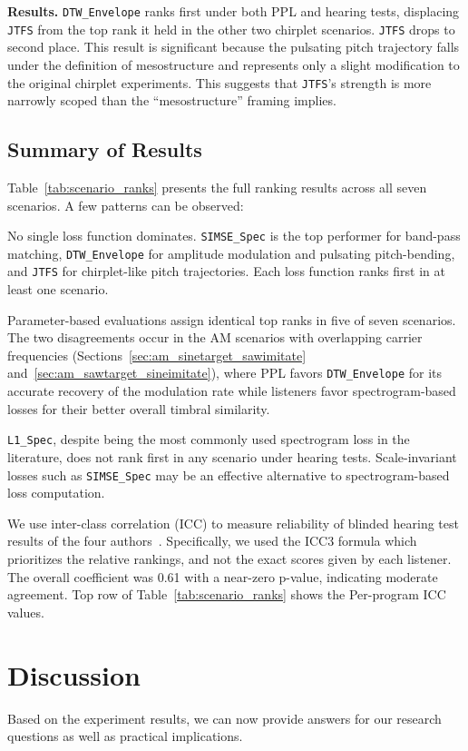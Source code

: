 \documentclass[10pt]{article} %
\newcommand{\SIMSESpec}{\texttt{SIMSE\_\allowbreak Spec}\xspace}
\newcommand{\LoneSpec}{\texttt{L1\_\allowbreak Spec}\xspace}
\newcommand{\JTFS}{\texttt{JTFS}\xspace}
\newcommand{\DTWEnv}{\texttt{DTW\_\allowbreak Envelope}\xspace}
\begin{document}
\noindent \textbf{Results.} \DTWEnv ranks first under both PPL and hearing tests, displacing \JTFS from the top rank it held in the other two chirplet scenarios. \JTFS drops to second place. This result is significant because the pulsating pitch trajectory falls under the definition of mesostructure and represents only a slight modification to the original chirplet experiments. This suggests that \JTFS's strength is more narrowly scoped than the ``mesostructure'' framing implies.


\subsection{Summary of Results}

Table~\ref{tab:scenario_ranks} presents the full ranking results across all seven scenarios. A few patterns can be observed:

No single loss function dominates. \SIMSESpec{} is the top performer for band-pass matching, \DTWEnv{} for amplitude modulation and pulsating pitch-bending, and \JTFS{} for chirplet-like pitch trajectories. Each loss function ranks first in at least one scenario.

Parameter-based evaluations assign identical top ranks in five of seven scenarios. The two disagreements occur in the AM scenarios with overlapping carrier frequencies (Sections~\ref{sec:am_sinetarget_sawimitate} and~\ref{sec:am_sawtarget_sineimitate}), where PPL favors \DTWEnv{} for its accurate recovery of the modulation rate while listeners favor spectrogram-based losses for their better overall timbral similarity.

\LoneSpec{}, despite being the most commonly used spectrogram loss in the literature, does not rank first in any scenario under hearing tests. Scale-invariant losses such as \SIMSESpec{} may be an effective alternative to spectrogram-based loss computation.

We use inter-class correlation (ICC) to measure reliability of blinded hearing test results of the four authors~\cite{liljequist2019intraclass}. Specifically, we used the ICC3 formula which prioritizes the relative rankings, and not the exact scores given by each listener. The overall coefficient was 0.61 with a near-zero p-value, indicating moderate agreement. Top row of Table~\ref{tab:scenario_ranks} shows the Per-program ICC values.




\section{Discussion}
Based on the experiment results, we can now provide answers for our research questions as well as practical implications.
\end{document}
